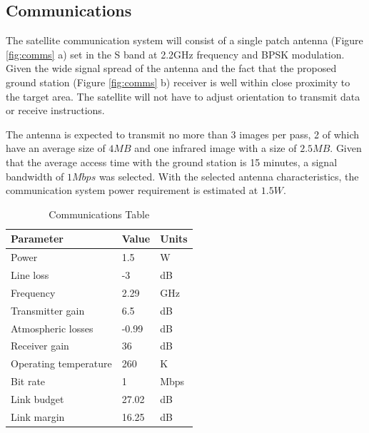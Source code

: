 \subsection{Communications}
The satellite communication system will consist of a single patch antenna (Figure \ref{fig:comms} a) set in the S band at 2.2GHz frequency and BPSK modulation. Given the wide signal spread of the antenna and the fact that the proposed ground station (Figure \ref{fig:comms} b) receiver is well within close proximity to the target area. The satellite will not have to adjust orientation to transmit data or receive instructions.

The antenna is expected to transmit no more than 3 images per pass, 2 of which have an average size of $4MB$ and one infrared image with a size of $2.5MB$. Given that the average access time with the ground station is 15 minutes, a signal bandwidth of $1Mbps$ was selected. With the selected antenna characteristics, the communication system power requirement is estimated at $1.5W$.\\
\begin{table}[hbt!]
\centering
\caption{Communications Table}
\begin{tabular}{lll}
\rowcolor[HTML]{C0C0C0} 
Parameter             & Value & Units \\ \hline
Power                 & 1.5   & W     \\
Line loss             & -3    & dB    \\
Frequency             & 2.29  & GHz   \\
Transmitter gain      & 6.5   & dB    \\
Atmospheric losses    & -0.99 & dB    \\
Receiver gain         & 36    & dB    \\
Operating temperature & 260   & K     \\
Bit rate              & 1     & Mbps  \\
Link budget           & 27.02 & dB    \\
Link margin           & 16.25 & dB   
\end{tabular}
\label{Tab:comms}
\end{table}
\\
